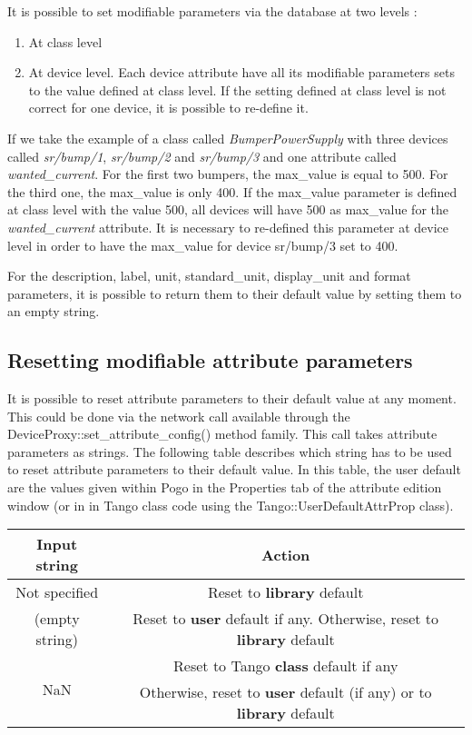 \vspace{0.3cm}


It is possible to set modifiable parameters via the database at two
levels :
\begin{enumerate}
\item At class level
\item At device level. Each device attribute have all its modifiable parameters
sets to the value defined at class level. If the setting defined at
class level is not correct for one device, it is possible to re-define
it.
\end{enumerate}
If we take the example of a class called \emph{BumperPowerSupply}
with three devices called \emph{sr/bump/1}, \emph{sr/bump/2} and \emph{sr/bump/3}
and one attribute called \emph{wanted\_current}. For the first two
bumpers, the max\_value is equal to 500. For the third one, the max\_value
is only 400. If the max\_value parameter is defined at class level
with the value 500, all devices will have 500 as max\_value for the
\emph{wanted\_current} attribute. It is necessary to re-defined this
parameter at device level in order to have the max\_value for device
sr/bump/3 set to 400.

For the description, label, unit, standard\_unit, display\_unit and
format parameters, it is possible to return them to their default
value by setting them to an empty string.


\subsection{Resetting modifiable attribute parameters}

It is possible to reset attribute parameters to their default value
at any moment. This could be done via the network call available through
the DeviceProxy::set\_attribute\_config() method family. This call
takes attribute parameters as strings. The following table describes
which string has to be used to reset attribute parameters to their
default value. In this table, the user default are the values given
within Pogo in the \textquotedbl{}Properties\textquotedbl{} tab of
the attribute edition window (or in in Tango class code using the
Tango::UserDefaultAttrProp class).\vspace{0.3cm}


\begin{center}
\begin{longtable}{|c|c|}
\hline 
Input string & Action\tabularnewline
\hline 
\hline 
\textquotedbl{}Not specified\textquotedbl{} & Reset to \textbf{library} default\tabularnewline
\hline 
\multirow{2}{*}{\textquotedbl{}\textquotedbl{} (empty string)} & \multirow{2}{*}{Reset to \textbf{user} default if any. Otherwise, reset to \textbf{library}
default}\tabularnewline
 & \tabularnewline
\hline 
\multirow{2}{*}{\textquotedbl{}NaN\textquotedbl{}} & Reset to Tango \textbf{class} default if any\tabularnewline
 & Otherwise, reset to \textbf{user} default (if any) or to \textbf{library}
default\tabularnewline
\hline 
\end{longtable}
\par\end{center}

